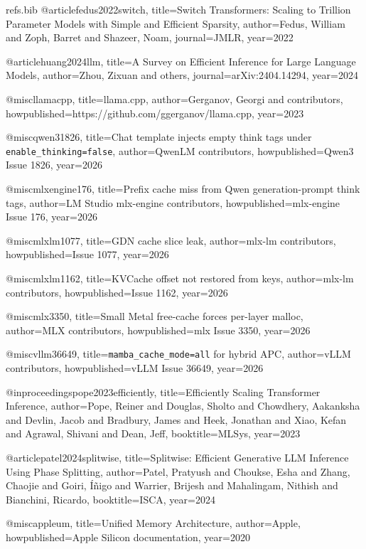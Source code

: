 \begin{filecontents*}[overwrite]{refs.bib}
@article{fedus2022switch,
  title={Switch Transformers: Scaling to Trillion Parameter Models with Simple and Efficient Sparsity},
  author={Fedus, William and Zoph, Barret and Shazeer, Noam},
  journal={JMLR},
  year={2022}
}

@article{huang2024llm,
  title={A Survey on Efficient Inference for Large Language Models},
  author={Zhou, Zixuan and others},
  journal={arXiv:2404.14294},
  year={2024}
}

@misc{llamacpp,
  title={{llama.cpp}},
  author={Gerganov, Georgi and contributors},
  howpublished={https://github.com/ggerganov/llama.cpp},
  year={2023}
}

@misc{qwen31826,
  title={Chat template injects empty think tags under \texttt{enable\_thinking=false}},
  author={{QwenLM contributors}},
  howpublished={Qwen3 Issue 1826},
  year={2026}
}

@misc{mlxengine176,
  title={Prefix cache miss from {Qwen} generation-prompt think tags},
  author={{LM Studio mlx-engine contributors}},
  howpublished={mlx-engine Issue 176},
  year={2026}
}

@misc{mlxlm1077,
  title={{GDN} cache slice leak},
  author={{mlx-lm contributors}},
  howpublished={Issue 1077},
  year={2026}
}

@misc{mlxlm1162,
  title={{KVCache} offset not restored from keys},
  author={{mlx-lm contributors}},
  howpublished={Issue 1162},
  year={2026}
}

@misc{mlx3350,
  title={Small Metal free-cache forces per-layer malloc},
  author={{MLX contributors}},
  howpublished={mlx Issue 3350},
  year={2026}
}

@misc{vllm36649,
  title={\texttt{mamba\_cache\_mode=all} for hybrid {APC}},
  author={{vLLM contributors}},
  howpublished={vLLM Issue 36649},
  year={2026}
}

@inproceedings{pope2023efficiently,
  title={Efficiently Scaling Transformer Inference},
  author={Pope, Reiner and Douglas, Sholto and Chowdhery, Aakanksha and Devlin, Jacob and Bradbury, James and Heek, Jonathan and Xiao, Kefan and Agrawal, Shivani and Dean, Jeff},
  booktitle={MLSys},
  year={2023}
}

@article{patel2024splitwise,
  title={{Splitwise}: Efficient Generative {LLM} Inference Using Phase Splitting},
  author={Patel, Pratyush and Choukse, Esha and Zhang, Chaojie and Goiri, {\'I}{\~n}igo and Warrier, Brijesh and Mahalingam, Nithish and Bianchini, Ricardo},
  booktitle={ISCA},
  year={2024}
}

@misc{appleum,
  title={Unified Memory Architecture},
  author={{Apple}},
  howpublished={Apple Silicon documentation},
  year={2020}
}


\end{filecontents*}
